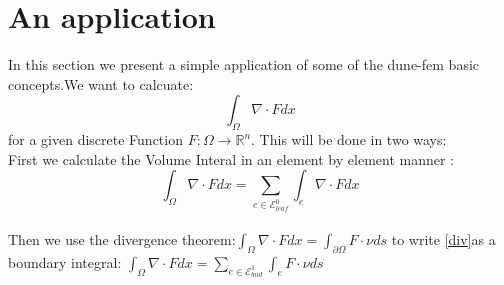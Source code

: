 \section{An application}
In this section we present a simple application of some of the dune-fem basic concepts.We want to calcuate:
\begin{equation}
\int_\Omega \nabla\cdot F dx 
\end{equation}\label{div}
for a given discrete Function $F:\Omega\rightarrow\mathbb{R}^n$.
This will be done in two ways:\\
First we calculate the Volume Interal in an element by element manner :\\
\begin{equation}
\int_\Omega \nabla\cdot F dx =\sum_{e\in\mathcal{E}^0_{leaf}} \int_e \nabla\cdot F dx
\end{equation}\\
Then we use the divergence theorem:$\int_\Omega \nabla\cdot F dx= \int_{\partial\Omega}F\cdot \nu ds$ to write \ref{div}as a boundary integral: $\int_\Omega \nabla\cdot F dx =\sum_{e\in\mathcal{E}^1_{bnd}} \int_e  F\cdot\nu ds$
  
  
  
  
  
  



